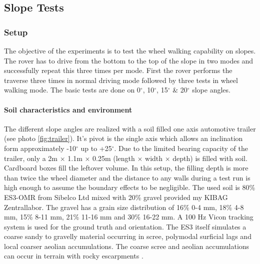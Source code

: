 \documentclass[a4paper,twocolumn]{esapub2005} %
\begin{document}



\subsection{Slope Tests}

\subsubsection{Setup}
The objective of the experiments is to test the wheel walking capability on slopes. The rover has to drive from the bottom to the top of the slope in two modes and successfully repeat this three times per mode. First the rover performs the traverse three times in normal driving mode followed by three tests in wheel walking mode. The basic tests are done on 0$^{\circ}$, 10$^{\circ}$, 15$^{\circ}$ \& 20$^{\circ}$ slope angles. 

\paragraph{Soil characteristics and environment}
The different slope angles are realized with a soil filled one axis automotive trailer (see photo \ref{fig:trailer}). It's pivot is the single axis which allows an inclination form approximately -10$^{\circ}$ up to +25$^{\circ}$. Due to the limited bearing capacity of the trailer, only a 2m $\times$ 1.1m $\times$ 0.25m (length $\times$ width $\times$ depth) is filled with soil. Cardboard boxes fill the leftover volume. In this setup, the filling depth is more than twice the wheel diameter and the distance to any walls during a test run is high enough to assume  the boundary effects to be negligible. 
The used soil is 80\% ES3-OMR from Sibelco Ltd mixed with 20\% gravel provided my KIBAG Zentrallabor. The gravel has a grain size distribution of 16\% 0-4 mm, 18\% 4-8 mm, 15\% 8-11 mm, 21\% 11-16 mm and 30\% 16-22 mm.
A 100 Hz Vicon tracking system is used for the ground truth and orientation. The ES3 itself simulates a coarse sandy to gravelly material occurring in scree, polymodal surficial lags and local coarser aeolian accumulations. The coarse scree and aeolian accumulations can occur in terrain with rocky escarpments \cite{michaud2014}.
\end{document}
